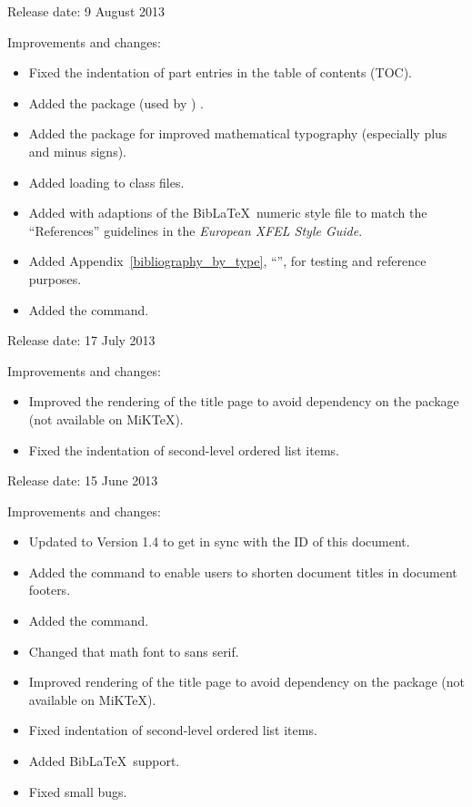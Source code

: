 \documentclass[]{xfel.eu-report}
\begin{document}

Release date: 9 August 2013

Improvements and changes: 

\begin{itemize}
	\item Fixed the indentation of part entries in the table of contents (TOC).
	\item Added the package  (used by ) .
	\item Added the package  for improved mathematical typography
	(especially plus and minus signs).
	\item Added  loading to class files.
	\item Added  with adaptions of the Bib\LaTeX\ numeric style
	file to match the ``References'' guidelines in the \emph{European XFEL Style Guide}.
	\item Added Appendix~\ref{bibliography_by_type}, ``'', for testing and reference purposes.
	\item Added the  command. 
\end{itemize} 

\newpage
{}

Release date: 17 July 2013

Improvements and changes: 

\begin{itemize}
	\item Improved the rendering of the title page to avoid dependency on the  package (not available on MiKTeX).
	\item Fixed the indentation of second-level ordered list items.
\end{itemize} 


Release date: 15 June 2013

Improvements and changes: 

\begin{itemize}
	\item Updated to Version 1.4 to get in sync with the ID of this document.
	\item Added the  command to enable users to shorten document titles in document footers.
	\item Added the  command. 
	\item Changed that math font to sans serif.
	\item Improved rendering of the title page to avoid dependency on the  package (not available on MiKTeX).
	\item Fixed indentation of second-level ordered list items.
	\item Added Bib\LaTeX\ support.
	\item Fixed small bugs.
\end{itemize} 
		
\end{document}
